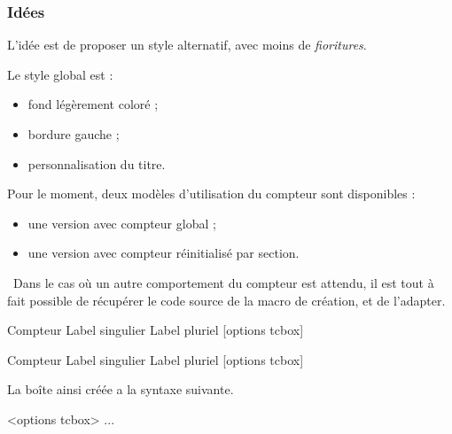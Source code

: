 \documentclass[french,11pt,a4paper]{article}
\begin{document}
\subsubsection{Idées}

L'idée est de proposer un style alternatif, avec moins de \textit{fioritures}.

Le style global est :

\begin{itemize}
	\item fond légèrement coloré ;
	\item bordure gauche ;
	\item personnalisation du titre.
\end{itemize}

Pour le moment, deux modèles d'utilisation du compteur sont disponibles :

\begin{itemize}
	\item une version avec compteur global ;
	\item une version avec compteur réinitialisé par section.
\end{itemize}

{\footnotesize \faBomb}~Dans le cas où un autre comportement du compteur est attendu, il est tout à fait possible de récupérer le code source de la macro de création, et de l'adapter.

\begin{codehigh}[language=latex/latex2,style/main=cyan!10,style/code=cyan!10]
%
  {Compteur}%
  {Label singulier}
  {Label pluriel}
  [options tcbox]

%
  {Compteur}%
  {Label singulier}
  {Label pluriel}
  [options tcbox]
\end{codehigh}

La boîte ainsi créée a la syntaxe suivante.

\begin{codehigh}[language=latex/latex2,style/main=cyan!10,style/code=cyan!10]
\begin{monenvt}[clés]<options tcbox>
...
\end{monenvt}

\end{codehigh}
\end{document}
